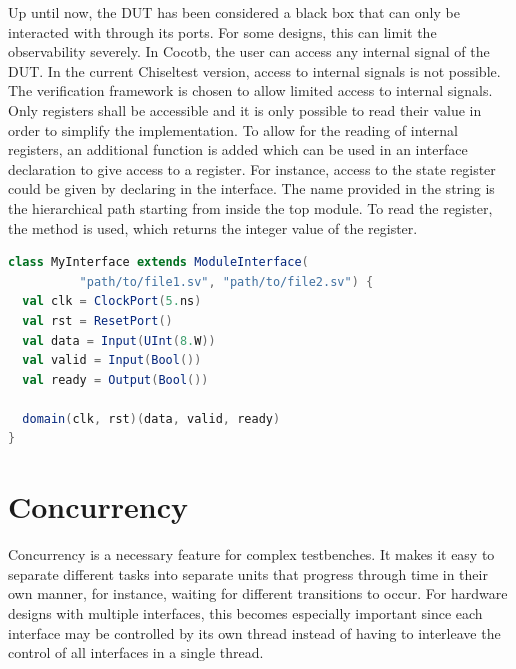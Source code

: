Up until now, the DUT has been considered a black box that can only be interacted with through its ports. For some designs, this can limit the observability severely. In Cocotb, the user can access any internal signal of the DUT. In the current Chiseltest version, access to internal signals is not possible. The verification framework is chosen to allow limited access to internal signals. Only registers shall be accessible and it is only possible to read their value in order to simplify the implementation. To allow for the reading of internal registers, an additional function is added which can be used in an interface declaration to give access to a register. For instance, access to the state register could be given by declaring  in the interface. The name provided in the string is the hierarchical path starting from inside the top module. To read the register, the  method is used, which returns the integer value of the register.


\begin{listing}
\begin{lstlisting}[language=scala, captionpos=b, caption=Example for an interface declaration in Scala. Each data signal is assocaited with a clock domain.,label=lst:interface]
class MyInterface extends ModuleInterface(
          "path/to/file1.sv", "path/to/file2.sv") {
  val clk = ClockPort(5.ns)
  val rst = ResetPort()
  val data = Input(UInt(8.W))
  val valid = Input(Bool())
  val ready = Output(Bool())

  domain(clk, rst)(data, valid, ready)
}
\end{lstlisting}
\end{listing}

\section{Concurrency} %

Concurrency is a necessary feature for complex testbenches. It makes it easy to separate different tasks into
separate units that progress through time in their own manner, for instance, waiting for different transitions to
occur. For hardware designs with multiple interfaces, this becomes especially important since each interface may be
controlled by its own thread instead of having to interleave the control of all interfaces in a single thread.

